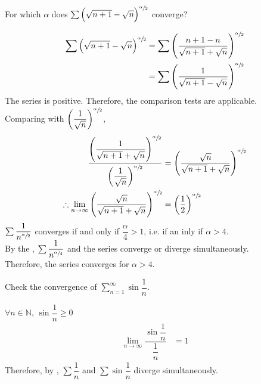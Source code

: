 \documentclass[fleqn, a4paper, 12pt, twoside]{article}
\theoremstyle{definition}
\theoremstyle{theorem}
\begin{document}
\begin{question}
	For which $\alpha$ does $\sum \left( \sqrt{n + 1} - \sqrt{n} \right)^{\sfrac{\alpha}{2}}$ converge?
\end{question}

\begin{solution}
	\begin{align*}
		\sum \left( \sqrt{n + 1} - \sqrt{n} \right)^{\sfrac{\alpha}{2}} &= \sum \left( \dfrac{n + 1 - n}{\sqrt{n + 1} + \sqrt{n}} \right)^{\sfrac{\alpha}{2}}\\
		&= \sum \left( \dfrac{1}{\sqrt{n + 1} - \sqrt{n}} \right)^{\sfrac{\alpha}{2}}
	\end{align*}
	The series is positive.
	Therefore, the comparison tests are applicable.\\
	Comparing with $\left( \dfrac{1}{\sqrt{n}} \right)^{\sfrac{\alpha}{2}}$,
	\begin{align*}
		\dfrac{\left( \dfrac{1}{\sqrt{n + 1} + \sqrt{n}} \right)^{\sfrac{\alpha}{2}}}{\left( \dfrac{1}{\sqrt{n}} \right)^{\sfrac{\alpha}{2}}} &= \left( \dfrac{\sqrt{n}}{\sqrt{n + 1} + \sqrt{n}} \right)^{\sfrac{\alpha}{2}}\\
		\therefore \lim\limits_{n \to \infty} \left( \dfrac{\sqrt{n}}{\sqrt{n + 1} + \sqrt{n}} \right)^{\sfrac{\alpha}{2}} &= \left( \dfrac{1}{2} \right)^{\sfrac{\alpha}{2}}
	\end{align*}
	$\sum \dfrac{1}{n^{\sfrac{\alpha}{2}}}$ converges if and only if $\dfrac{\alpha}{4} > 1$, i.e. if an inly if $\alpha > 4$.\\
	By the , $\sum \dfrac{1}{n^{\sfrac{\alpha}{4}}}$ and the series converge or diverge simultaneously.\\
	Therefore, the series converges for $\alpha > 4$.
\end{solution}

\begin{question}
	Check the convergence of $\sum\limits_{n = 1}^{\infty} \sin \dfrac{1}{n}$.
\end{question}

\begin{solution}
	$\forall n \in \mathbb{N}$, $\sin \dfrac{1}{n} \ge 0$\\
	\begin{align*}
		\lim\limits_{n \to \infty} \dfrac{\sin \dfrac{1}{n}}{\dfrac{1}{n}} &= 1
	\end{align*}
	Therefore, by , $\sum \dfrac{1}{n}$ and $\sum \sin \dfrac{1}{n}$ diverge simultaneously.
\end{solution}
\end{document}
